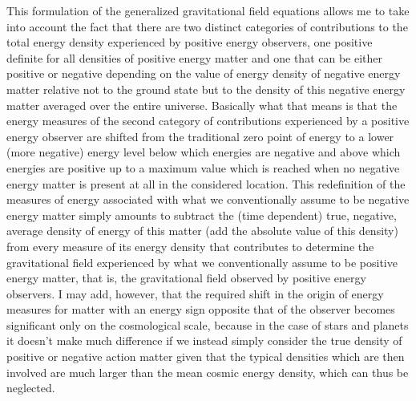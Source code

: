 \documentclass[notitlepage,12pt]{report}
\begin{document}
This formulation of the generalized gravitational field equations allows me to take into account the fact that there are two distinct categories of contributions to the total energy density experienced by positive energy observers, one positive definite for all densities of positive energy matter and one that can be either positive or negative depending on the value of energy density of negative energy matter relative not to the ground state but to the density of this negative energy matter averaged over the entire universe. Basically what that means is that the energy measures of the second category of contributions experienced by a positive energy observer are shifted from the traditional zero point of energy to a lower (more negative) energy level below which energies are negative and above which energies are positive up to a maximum value which is reached when no negative energy matter is present at all in the considered location. This redefinition of the measures of energy associated with what we conventionally assume to be negative energy matter simply amounts to subtract the (time dependent) true, negative, average density of energy of this matter (add the absolute value of this density) from every measure of its energy density that contributes to determine the gravitational field experienced by what we conventionally assume to be positive energy matter, that is, the gravitational field observed by positive energy observers. I may add, however, that the required shift in the origin of energy measures for matter with an energy sign opposite that of the observer becomes significant only on the cosmological scale, because in the case of stars and planets it doesn't make much difference if we instead simply consider the true density of positive or negative action matter given that the typical densities which are then involved are much larger than the mean cosmic energy density, which can thus be neglected.
\end{document}
